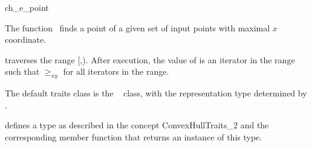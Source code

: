 

\begin{ccRefFunction}{ch_e_point}  %

\ccDefinition
  
The function \ccRefName\ finds a point of a given set  
of input points with maximal $x$ coordinate.


           {traverses the range [,).
            After execution, the value of
             is an iterator in the range such that  $\ge_{xy}$
             for all iterators  in the range. }

The default traits class  is the \cgal\ 
 class,
with the representation type determined by .

 defines a type  as described in 
the concept ConvexHullTraits\_2 and the corresponding member
function that returns an instance of this type.



\ccSeeAlso

 \\
 \\
 \\
 \\
 \\

\end{ccRefFunction}


